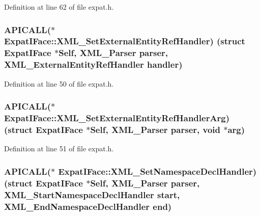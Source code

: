 Definition at line 62 of file expat.\+h.

\subsubsection[{\texorpdfstring{X\+M\+L\+\_\+\+Set\+External\+Entity\+Ref\+Handler}{XML_SetExternalEntityRefHandler}}]{ A\+P\+I\+C\+A\+LL($\ast$ Expat\+I\+Face\+::\+X\+M\+L\+\_\+\+Set\+External\+Entity\+Ref\+Handler) (struct {\bf Expat\+I\+Face} $\ast$Self, {\bf X\+M\+L\+\_\+\+Parser} parser, {\bf X\+M\+L\+\_\+\+External\+Entity\+Ref\+Handler} handler)}\hypertarget{struct_expat_i_face_af460be603cc484ad1c5b3aeb3065d5a6}{}\label{struct_expat_i_face_af460be603cc484ad1c5b3aeb3065d5a6}


Definition at line 50 of file expat.\+h.

\subsubsection[{\texorpdfstring{X\+M\+L\+\_\+\+Set\+External\+Entity\+Ref\+Handler\+Arg}{XML_SetExternalEntityRefHandlerArg}}]{ A\+P\+I\+C\+A\+LL($\ast$ Expat\+I\+Face\+::\+X\+M\+L\+\_\+\+Set\+External\+Entity\+Ref\+Handler\+Arg) (struct {\bf Expat\+I\+Face} $\ast$Self, {\bf X\+M\+L\+\_\+\+Parser} parser, {\bf void} $\ast$arg)}\hypertarget{struct_expat_i_face_a6f0565b8c879c72001f1b5acfb745613}{}\label{struct_expat_i_face_a6f0565b8c879c72001f1b5acfb745613}


Definition at line 51 of file expat.\+h.

\subsubsection[{\texorpdfstring{X\+M\+L\+\_\+\+Set\+Namespace\+Decl\+Handler}{XML_SetNamespaceDeclHandler}}]{ A\+P\+I\+C\+A\+LL($\ast$ Expat\+I\+Face\+::\+X\+M\+L\+\_\+\+Set\+Namespace\+Decl\+Handler) (struct {\bf Expat\+I\+Face} $\ast$Self, {\bf X\+M\+L\+\_\+\+Parser} parser, {\bf X\+M\+L\+\_\+\+Start\+Namespace\+Decl\+Handler} {\bf start}, {\bf X\+M\+L\+\_\+\+End\+Namespace\+Decl\+Handler} {\bf end})}\hypertarget{struct_expat_i_face_ad75dfc0cd0d4cd9d42f738fd3c60848e}{}\label{struct_expat_i_face_ad75dfc0cd0d4cd9d42f738fd3c60848e}


